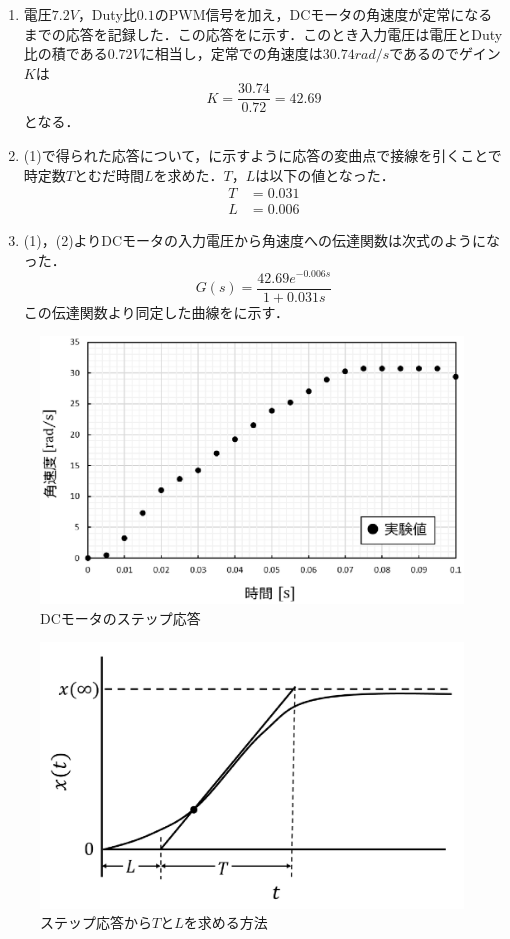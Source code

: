 \begin{enumerate}
\item 電圧$7.2\unit{V}$，Duty比$0.1$のPWM信号を加え，DCモータの角速度が定常になるまでの応答を記録した．この応答をに示す．このとき入力電圧は電圧とDuty比の積である$0.72\unit{V}$に相当し，定常での角速度は$30.74\unit{rad/s}$であるのでゲイン$K$は
\begin{equation}
 K=\frac{30.74}{0.72}=42.69
\end{equation}
となる．
\item (1)で得られた応答について，に示すように応答の変曲点で接線を引くことで時定数$T$とむだ時間$L$を求めた．$T$，$L$は以下の値となった．
\begin{align}
 T&=0.031 \\
 L&=0.006
\end{align}
\item(1)，(2)よりDCモータの入力電圧から角速度への伝達関数は次式のようになった．
\begin{equation}
 G(s)=\frac{42.69e^{-0.006s}}{1+0.031s}
\end{equation} 
この伝達関数より同定した曲線をに示す．
\end{enumerate}

\begin{figure}[htb]
  \centering
    \includegraphics[width=0.7\hsize]{picture/eps/dcmotor_response.eps}
  \caption{DCモータのステップ応答}
  \label{fig::dcmotor_response}
  
\end{figure}

\begin{figure}[htb]
  \centering
    \includegraphics[width=0.7\hsize]{picture/eps/step_doutei.eps}
  \caption{ステップ応答から$T$と$L$を求める方法}
  \label{fig::step_doutei}
  
\end{figure}


